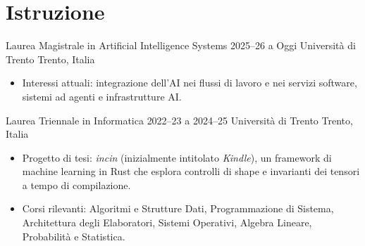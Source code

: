 \section{Istruzione}

\cveducation
  {Laurea Magistrale in Artificial Intelligence Systems}
  {2025--26 a Oggi}
  {Università di Trento}
  {Trento, Italia}
  {
    \begin{itemize}
      \item Interessi attuali: integrazione dell'AI nei flussi di lavoro e nei servizi software, sistemi ad agenti e infrastrutture AI.
    \end{itemize}
  }

\cveducation
  {Laurea Triennale in Informatica}
  {2022--23 a 2024--25}
  {Università di Trento}
  {Trento, Italia}
  {
    \begin{itemize}
      \item Progetto di tesi: \textit{incin} (inizialmente intitolato \textit{Kindle}), un framework di machine learning in Rust che esplora controlli di shape e invarianti dei tensori a tempo di compilazione.
      \item Corsi rilevanti: Algoritmi e Strutture Dati, Programmazione di Sistema, Architettura degli Elaboratori, Sistemi Operativi, Algebra Lineare, Probabilità e Statistica.
    \end{itemize}
  }

